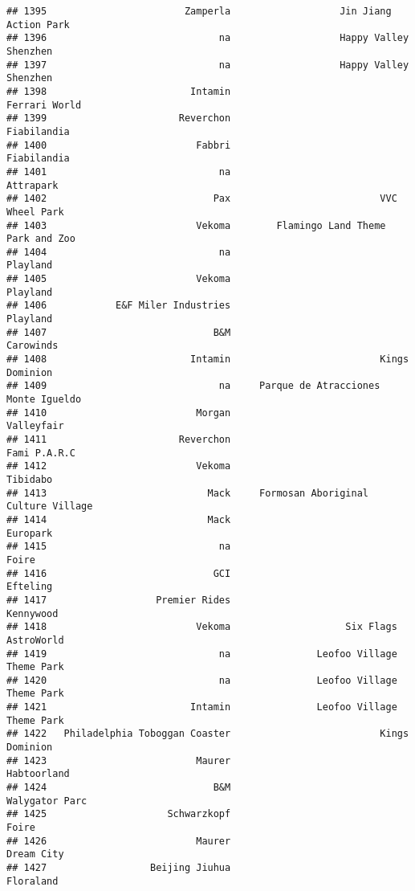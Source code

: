 \documentclass[
]{article}
\begin{document}
\begin{verbatim}
## 1395                        Zamperla                   Jin Jiang Action Park
## 1396                              na                   Happy Valley Shenzhen
## 1397                              na                   Happy Valley Shenzhen
## 1398                         Intamin                           Ferrari World
## 1399                       Reverchon                             Fiabilandia
## 1400                          Fabbri                             Fiabilandia
## 1401                              na                               Attrapark
## 1402                             Pax                          VVC Wheel Park
## 1403                          Vekoma        Flamingo Land Theme Park and Zoo
## 1404                              na                                Playland
## 1405                          Vekoma                                Playland
## 1406            E&F Miler Industries                                Playland
## 1407                             B&M                               Carowinds
## 1408                         Intamin                          Kings Dominion
## 1409                              na     Parque de Atracciones Monte Igueldo
## 1410                          Morgan                              Valleyfair
## 1411                       Reverchon                            Fami P.A.R.C
## 1412                          Vekoma                                Tibidabo
## 1413                            Mack     Formosan Aboriginal Culture Village
## 1414                            Mack                                Europark
## 1415                              na                                   Foire
## 1416                             GCI                                Efteling
## 1417                   Premier Rides                               Kennywood
## 1418                          Vekoma                    Six Flags AstroWorld
## 1419                              na               Leofoo Village Theme Park
## 1420                              na               Leofoo Village Theme Park
## 1421                         Intamin               Leofoo Village Theme Park
## 1422   Philadelphia Toboggan Coaster                          Kings Dominion
## 1423                          Maurer                             Habtoorland
## 1424                             B&M                          Walygator Parc
## 1425                     Schwarzkopf                                   Foire
## 1426                          Maurer                              Dream City
## 1427                  Beijing Jiuhua                               Floraland

\end{verbatim}
\end{document}
